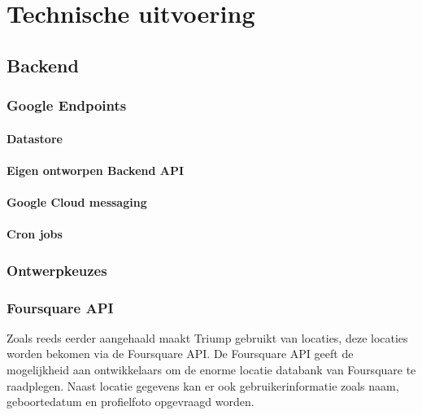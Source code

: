 
\chapter{Technische uitvoering}



\section{Backend}
\subsection{Google Endpoints}

\subsubsection{Datastore}
\subsubsection{Eigen ontworpen Backend API}

\subsubsection{Google Cloud messaging}

\subsubsection{Cron jobs}
\subsection{Ontwerpkeuzes}



\subsection{Foursquare API}

Zoals reeds eerder aangehaald maakt Triump gebruikt van locaties, deze locaties worden bekomen via de Foursquare API. De Foursquare API geeft de mogelijkheid aan ontwikkelaars om de enorme locatie databank van Foursquare te raadplegen. Naast locatie gegevens kan er ook gebruikerinformatie zoals naam, geboortedatum en profielfoto opgevraagd worden.

